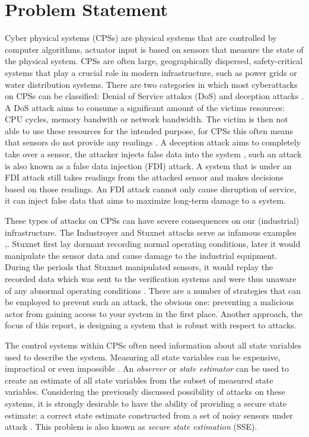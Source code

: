 \section{Problem Statement}
Cyber physical systems (CPSs) are physical systems that are controlled by computer algorithms, actuator input is based on sensors that measure the state of the physical system. CPSs are often large, geographically dispersed, safety-critical systems that play a crucial role in modern infrastructure, such as power grids or water distribution systems. There are two categories in which most cyberattacks on CPSs can be classified: Denial of Service attakcs (DoS) and deception attacks \cite{Ding2021SecureSurvey}. A DoS attack aims to consume a significant amount of the victims resources: CPU cycles, memory bandwith or network bandwidth. The victim is then not able to use these resources for the intended purpose, for CPSs this often means that sensors do not provide any readings \cite{Yu2014AnAttacks}. A deception attack aims to completely take over a sensor, the attacker injects false data into the system \cite{Serpanos2022FalseSystems}, such an attack is also known as a false data injection (FDI) attack. A system that is under an FDI attack still takes readings from the attacked sensor and makes decisions based on those readings. An FDI attack cannot only cause disruption of service, it can inject false data that aims to maximize long-term damage to a system. 

These types of attacks on CPSs can have severe consequences on our (industrial) infrastructure. The Industroyer and Stuxnet attacks serve as infamous examples \cite{Kushner2013TheStuxnet},\cite{Lameiras2022Industroyer:Grid}. Stuxnet first lay dormant recording normal operating conditions, later it would manipulate the sensor data and cause damage to the industrial equipment. During the periods that Stuxnet manipulated sensors, it would replay the recorded data which was sent to the verification systems and were thus unaware of any abnormal operating conditions \cite{Fidler2011Was_Stuxnet_an_Act_of_War_Decoding_a_Cyberattack}. There are a number of strategies that can be employed to prevent such an attack, the obvious one: preventing a malicious actor from gaining access to your system in the first place. Another approach, the focus of this report, is designing a system that is robust with respect to attacks. 

The control systems within CPSs often need information about all state variables used to describe the system. Measuring all state variables can be expensive, impractical or even impossible \cite{Buchi2010StateExamples}. An \textit{observer} or \textit{state estimator} can be used to create an estimate of all state variables from the subset of measured state variables. Considering the previously discussed possibility of attacks on these systems, it is strongly desirable to have the ability of providing a secure state estimate: a correct state estimate constructed from a set of noisy sensors under attack \cite{Shoukry2017SecureApproach}. This problem is also known as \textit{secure state estimation} (SSE). 

